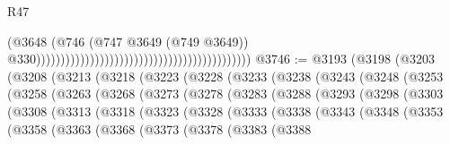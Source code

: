 \begin{lexlean}{R47}
\begin{coremodule}
                                                                                        (@3648
                                                                                          (@746
                                                                                            (@747
                                                                                              @3649
                                                                                              (@749
                                                                                                @3649))
                                                                                            @330))))))))))))))))))))))))))))))))))))))))))))
@3746 := @3193
    (@3198
      (@3203
        (@3208
          (@3213
            (@3218
              (@3223
                (@3228
                  (@3233
                    (@3238
                      (@3243
                        (@3248
                          (@3253
                            (@3258
                              (@3263
                                (@3268
                                  (@3273
                                    (@3278
                                      (@3283
                                        (@3288
                                          (@3293
                                            (@3298
                                              (@3303
                                                (@3308
                                                  (@3313
                                                    (@3318
                                                      (@3323
                                                        (@3328
                                                          (@3333
                                                            (@3338
                                                              (@3343
                                                                (@3348
                                                                  (@3353
                                                                    (@3358
                                                                      (@3363
                                                                        (@3368
                                                                          (@3373
                                                                            (@3378
                                                                              (@3383
                                                                                (@3388

\end{coremodule}
\end{lexlean}
